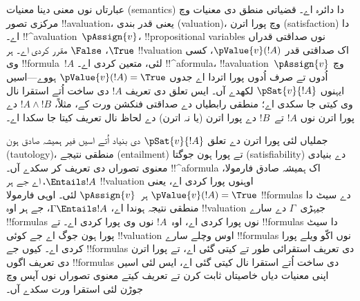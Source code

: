 \documentclass[../../../include/open-logic-section]{subfiles}
\begin{document}
عبارتاں نوں معنی دینا معنیات (semantics) دا دائرہ اے۔ قضیاتی منطق دی
معنیات وچ مرکزی تصور !!a{valuation}، یعنی قدر بندی (valuation)، وچ
پورا اترن (satisfaction) دا اے۔
!!^a{valuation}~$\pAssign{v}$، !!{propositional variable}s نوں صداقتی
قدراں $\True$، $\False$ مقرر کردی اے۔ ہر !!{valuation} اک صداقتی قدر
$\pValue{v}(!A)$، کسی وی !!{formula}~$!A$ لئی، متعین کردی اے۔
!!^a{formula}، !!a{valuation}~$\pAssign{v}$ وچ اُدوں تے صرف اُدوں پورا
اتردا اے جدوں $\pValue{v}(!A) = \True$ ہووے—اسیں ایہنوں
$\pSat{v}{!A}$ لکھدے آں۔ ایس تعلق دی تعریف $!A$ دی ساخت اُتے استقرا
نال وی کیتی جا سکدی اے؛ منطقی رابطیاں دے صداقتی فنکشن ورت کے، مثلاً،
$!A \land !B$ دے پورا اترن نوں $!A$ تے~$!B$ دے پورا اترن (یا نہ
اترن) دے لحاظ نال تعریف کیتا جا سکدا اے۔

جملیاں لئی پورا اترن دے تعلق $\pSat{v}{!A}$ دی بنیاد اُتے اسیں فیر
ہمیشہ صادق ہون (tautology)، منطقی نتیجے (entailment) تے پورا ہون جوگتا
(satisfiability) دے بنیادی معنوی تصوراں
دی تعریف کر سکدے آں۔ !!^a{formula} اک ہمیشہ صادق فارمولا،
$\Entails !A$، اے جے ہر !!{valuation} اوہنوں پورا کردی اے، یعنی
$\pValue{v}(!A) = \True$ ہر~$\pAssign{v}$ لئی۔ اوہی فارمولا
!!{formula}s دے سیٹ دا منطقی نتیجہ ہوندا اے، $\Gamma \Entails !A$، جے ہر اوہ
!!{valuation} جیہڑی~$\Gamma$ دے سارے !!{formula}s نوں پورا کردی اے،
اوہ~$!A$ نوں وی پورا کردی اے۔ تے !!{formula}s دا سیٹ پورا ہون جوگ اے
جے کوئی !!{valuation} اوس وچلے سارے !!{formula}s نوں اکّو ویلے پورا
کردی اے۔ کیوں جے !!{formula}s دی تعریف استقرائی طور تے کیتی گئی اے،
تے پورا اترن دی تعریف اگوں !!{formula}s دی ساخت اُتے استقرا نال کیتی
گئی اے، ایس لئی اسیں اپنی معنیات دیاں خاصیتاں ثابت کرن تے تعریف کیتے
معنوی تصوراں نوں آپس وچ جوڑن لئی استقرا ورت سکدے آں۔
\end{document}
